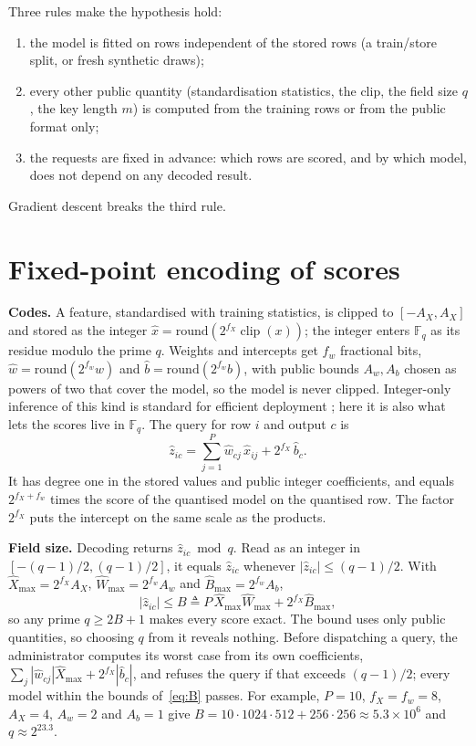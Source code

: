 \documentclass[conference]{IEEEtran}
\theoremstyle{remark}
\newcommand{\F}{\mathbb{F}}
\newcommand{\xh}{\hat{x}}
\newcommand{\wh}{\hat{w}}
\newcommand{\bh}{\hat{b}}
\newcommand{\clip}{\operatorname{clip}}
\begin{document}
Three rules make the hypothesis hold:
\begin{enumerate}
\item the model is fitted on rows independent of the stored rows (a train/store split, or
      fresh synthetic draws);
\item every other public quantity (standardisation statistics, the clip, the field size
      $q$, the key length $m$) is computed from the training rows or from the public format
      only;
\item the requests are fixed in advance: which rows are scored, and by which model, does
      not depend on any decoded result.
\end{enumerate}
Gradient descent breaks the third rule.

\section{Fixed-point encoding of scores}\label{sec:encoding}

\textbf{Codes.} A feature, standardised with training statistics, is clipped to
$[-A_X,A_X]$ and stored as the integer $\xh=\mathrm{round}(2^{f_X}\clip(x))$; the integer
enters $\F_q$ as its residue modulo the prime $q$. Weights and intercepts get $f_w$
fractional bits, $\wh=\mathrm{round}(2^{f_w}w)$ and $\bh=\mathrm{round}(2^{f_w}b)$, with
public bounds $A_w,A_b$ chosen as powers of two that cover the model, so the model is never
clipped. Integer-only inference of this kind is standard for efficient deployment
\cite{jacob2018}; here it is also what lets the scores live in $\F_q$. The query for row $i$ and output $c$ is
\begin{equation}\label{eq:query}
\hat z_{ic}=\sum_{j=1}^{P}\wh_{cj}\,\xh_{ij}+2^{f_X}\,\bh_c .
\end{equation}
It has degree one in the stored values and public integer coefficients, and equals
$2^{f_X+f_w}$ times the score of the quantised model on the quantised row. The factor
$2^{f_X}$ puts the intercept on the same scale as the products.

\textbf{Field size.} Decoding returns $\hat z_{ic}\bmod q$. Read as an integer in
$[-(q-1)/2,(q-1)/2]$, it equals $\hat z_{ic}$ whenever $|\hat z_{ic}|\le(q-1)/2$. With
$\hat X_{\max}=2^{f_X}A_X$, $\hat W_{\max}=2^{f_w}A_w$ and $\hat B_{\max}=2^{f_w}A_b$,
\begin{equation}\label{eq:B}
|\hat z_{ic}|\le B\triangleq P\,\hat X_{\max}\hat W_{\max}+2^{f_X}\hat B_{\max},
\end{equation}
so any prime $q\ge2B+1$ makes every score exact. The bound uses only public quantities, so
choosing $q$ from it reveals nothing. Before dispatching a query, the administrator computes
its worst case from its own coefficients, $\sum_j|\wh_{cj}|\hat X_{\max}+2^{f_X}|\bh_c|$, and
refuses the query if that exceeds $(q-1)/2$; every model within the bounds
of~\eqref{eq:B} passes. For example,
$P=10$, $f_X=f_w=8$, $A_X=4$, $A_w=2$ and $A_b=1$ give
$B=10\cdot1024\cdot512+256\cdot256\approx5.3\times10^6$ and $q\approx2^{23.3}$.
\end{document}
